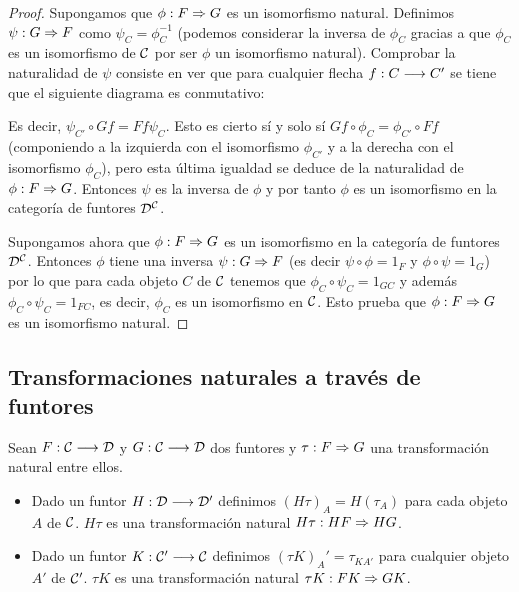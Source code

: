\begin{proof}
  Supongamos que $\phi: F\Rightarrow G$ es un isomorfismo natural. Definimos
  $\psi: G\Rightarrow F$ como $\psi_C = \phi_C^{-1}$ (podemos
  considerar la inversa de $\phi_C$ gracias a que $\phi_C$ es un isomorfismo de
  $\mathcal{C}$ por ser $\phi$ un isomorfismo natural). Comprobar la
  naturalidad de $\psi$ consiste en ver que para cualquier
  flecha $f: C\longrightarrow C'$ se tiene que el siguiente diagrama es
  conmutativo:
  \begin{center}
  \end{center}
  Es decir, $\psi_{C'} \circ Gf = Ff \psi_C$. Esto es cierto sí y solo
  sí $Gf \circ \phi_C = \phi_{C'} \circ Ff$ (componiendo a la izquierda
  con el isomorfismo $\phi_{C'}$ y a la derecha con el isomorfismo
  $\phi_C$), pero esta última igualdad se deduce de la naturalidad
  de $\phi: F\Rightarrow G$. Entonces
  $\psi$ es la inversa de $\phi$ y por tanto
  $\phi$ es un isomorfismo en la categoría de funtores
  $\mathcal{D}^{\mathcal{C}}$.


  Supongamos ahora que $\phi: F\Rightarrow G$ es un isomorfismo en la
  categoría de funtores $\mathcal{D}^{\mathcal{C}}$. Entonces $\phi$ tiene
  una inversa $\psi: G\Rightarrow F$ (es decir
  $\psi \circ \phi = 1_F$ y $\phi \circ \psi = 1_G$)
  por lo que para cada objeto
  $C$ de $\mathcal{C}$ tenemos que $\phi_C \circ \psi_C = 1_{GC}$ y
  además $\phi_C \circ \psi_C = 1_{FC}$, es decir, $\phi_C$
  es un isomorfismo en $\mathcal{C}$. Esto prueba que
  $\phi: F\Rightarrow G$ es un isomorfismo natural.
\end{proof}

\subsection{Transformaciones naturales a través de funtores}
Sean $F: \mathcal{C}\longrightarrow \mathcal{D}$ y $G: \mathcal{C}\longrightarrow \mathcal{D}$ dos funtores y
$\tau : F\Rightarrow G$ una transformación natural entre ellos.
\begin{itemize}
\item Dado un funtor $H: \mathcal{D}\longrightarrow \mathcal{D}'$ definimos
$(H\tau)_A = H(\tau_A)$ para cada objeto $A$ de
$\mathcal{C}$. $H\tau$ es una transformación natural
$H\tau : HF\Rightarrow HG$.
\item Dado un funtor $K: \mathcal{C}'\longrightarrow \mathcal{C}$ definimos
$(\tau K)_A' = \tau_{KA'}$ para cualquier objeto
$A'$ de $\mathcal{C}'$. $\tau K$ es una transformación natural
$\tau K : FK\Rightarrow GK$.
\end{itemize}

